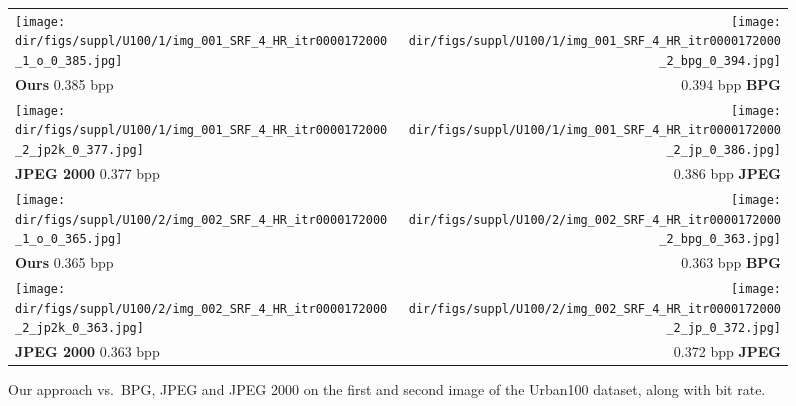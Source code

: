 \begin{subappendices}
\begin{figure*}[!h]
\centering
\setlength{\tabcolsep}{1pt}
\begin{tabular}{lr}
    
\texttt{[image: \\dir/figs/suppl/U100/1/img\_001\_SRF\_4\_HR\_itr0000172000\_1\_o\_0\_385.jpg]}&
\texttt{[image: \\dir/figs/suppl/U100/1/img\_001\_SRF\_4\_HR\_itr0000172000\_2\_bpg\_0\_394.jpg]}\\[-0.5ex]
\textbf{Ours} 0.385 bpp & 0.394 bpp \textbf{BPG} \\
\texttt{[image: \\dir/figs/suppl/U100/1/img\_001\_SRF\_4\_HR\_itr0000172000\_2\_jp2k\_0\_377.jpg]}&
\texttt{[image: \\dir/figs/suppl/U100/1/img\_001\_SRF\_4\_HR\_itr0000172000\_2\_jp\_0\_386.jpg]}\\
\textbf{JPEG 2000} 0.377 bpp & 0.386 bpp \textbf{JPEG}
\\[0.5cm]
    
\texttt{[image: \\dir/figs/suppl/U100/2/img\_002\_SRF\_4\_HR\_itr0000172000\_1\_o\_0\_365.jpg]}&
\texttt{[image: \\dir/figs/suppl/U100/2/img\_002\_SRF\_4\_HR\_itr0000172000\_2\_bpg\_0\_363.jpg]}\\[-0.5ex]
\textbf{Ours} 0.365 bpp & 0.363 bpp \textbf{BPG} \\
\texttt{[image: \\dir/figs/suppl/U100/2/img\_002\_SRF\_4\_HR\_itr0000172000\_2\_jp2k\_0\_363.jpg]}&
\texttt{[image: \\dir/figs/suppl/U100/2/img\_002\_SRF\_4\_HR\_itr0000172000\_2\_jp\_0\_372.jpg]}\\
\textbf{JPEG 2000} 0.363 bpp & 0.372 bpp \textbf{JPEG}

\end{tabular}
\caption{\label{imgc:fig:vis_ex_Urban100_first}Our approach vs.\ BPG, JPEG and JPEG 2000 on the first and second image of the Urban100 dataset, along with bit rate.}
\end{figure*}


\end{subappendices}
